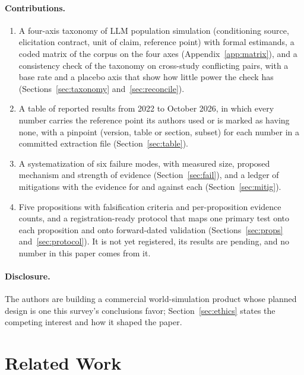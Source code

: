 \documentclass[11pt]{article}
\begin{document}
\paragraph{Contributions.}
\begin{enumerate}
  \item A four-axis taxonomy of LLM population simulation (conditioning source, elicitation contract, unit of claim, reference point) with formal estimands, a coded matrix of the corpus on the four axes (Appendix~\ref{app:matrix}), and a consistency check of the taxonomy on \cConflicts{} cross-study conflicting pairs, with a base rate and a placebo axis that show how little power the check has (Sections~\ref{sec:taxonomy} and~\ref{sec:reconcile}).
  \item A table of reported results from 2022 to October 2026, in which every number carries the reference point its authors used or is marked as having none, with a pinpoint (version, table or section, subset) for each number in a committed extraction file (Section~\ref{sec:table}).
  \item A systematization of six failure modes, with measured size, proposed mechanism and strength of evidence (Section~\ref{sec:fail}), and a ledger of mitigations with the evidence for and against each (Section~\ref{sec:mitig}).
  \item Five propositions with falsification criteria and per-proposition evidence counts, and a registration-ready protocol that maps one primary test onto each proposition and onto forward-dated validation (Sections~\ref{sec:props} and~\ref{sec:protocol}). It is not yet registered, its results are pending, and no number in this paper comes from it.
\end{enumerate}

\paragraph{Disclosure.} The authors are building a commercial world-simulation product whose planned design is one this survey's conclusions favor; Section~\ref{sec:ethics} states the competing interest and how it shaped the paper.

\section{Related Work}
\label{sec:related}
\end{document}
